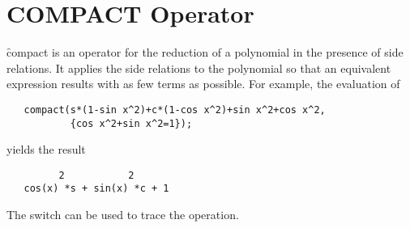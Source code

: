 \section{COMPACT Operator}
\label{sec:COMPACT}

\f{compact} is an operator for the reduction of a polynomial in the
presence of side relations.  It applies the side relations to the
polynomial so that an equivalent expression results with as few terms as
possible.  For example, the evaluation of
\begin{verbatim}
   compact(s*(1-sin x^2)+c*(1-cos x^2)+sin x^2+cos x^2,
           {cos x^2+sin x^2=1});
\end{verbatim}
yields the result
\begin{verbatim}
         2           2
   cos(x) *s + sin(x) *c + 1
\end{verbatim}
\hypertarget{switch:TRCOMPACT}{}
The switch  can be used to trace the operation.


